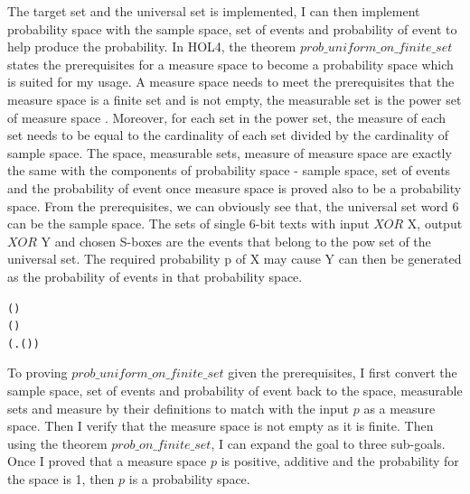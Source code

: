 \documentclass{article}
\begin{document}
\begin{alltt}
  
\end{alltt}

The target set and the universal set is implemented, I can then implement probability space with the sample space,
set of events and probability of event to help produce
the probability. In HOL4, the theorem $prob\_uniform\_on\_finite\_set$ states the prerequisites for a measure space
to become a probability space which is suited for my usage. A measure space needs to meet the prerequisites that the measure
space is a finite set and is not empty, the measurable set is the
power set of measure space . Moreover, for each set in the power set, the measure of each set needs to be equal to the
cardinality of each set divided by the cardinality of sample space.
The space, measurable sets, measure of measure space are exactly the same with the components of probability
space - sample space, set of events and the probability of event once measure space is proved also to be a probability space.
From the prerequisites, we can obviously see that, the universal set word 6 can be the sample space.
The sets of single 6-bit texts with input $XOR$ X, output $XOR$ Y and chosen S-boxes are the events that belong to the
pow set of the universal set.
The required probability p of X may cause Y can then be generated as the probability of events in that probability space.

\begin{alltt}
  \HOLTokenTurnstile{}  ( ) \HOLSymConst{\HOLTokenConj{}}   \HOLSymConst{\HOLTokenNotEqual{}} \HOLSymConst{\HOLTokenEmpty{}} \HOLSymConst{\HOLTokenConj{}}
     \HOLSymConst{=}  ( ) \HOLSymConst{\HOLTokenConj{}}
   (\HOLSymConst{\HOLTokenForall{}}.  \HOLSymConst{\HOLTokenIn{}}   \HOLSymConst{\HOLTokenImp{}}    \HOLSymConst{=} \HOLSymConst{\&}  \HOLSymConst{/} \HOLSymConst{\&} ( )) \HOLSymConst{\HOLTokenImp{}}
    
\end{alltt}

To proving $prob\_uniform\_on\_finite\_set$ given the prerequisites, I first convert the sample space,
set of events and probability of event back
to the space, measurable sets and measure by their definitions to match with the input $p$ as a measure space. Then I
verify that the measure space is not empty as it is finite.
Then using the theorem $prob\_on\_finite\_set$, I can
expand the goal to three sub-goals. Once I proved that a measure space $p$ is positive, additive and the probability
for the space is 1, then $p$ is a probability space.
\end{document}
